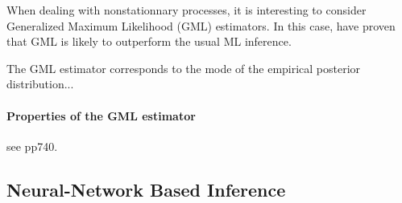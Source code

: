 \documentclass[11pt,a4paper,openany ]{book}
\begin{document}
When dealing with nonstationnary processes, it is interesting to consider Generalized Maximum Likelihood (GML) estimators. In this case, \cite{Adlouni_generalized_2007} have proven that GML is likely to outperform the usual ML inference.

The GML estimator corresponds to the mode of the empirical posterior distribution...

\paragraph{Properties of the GML estimator} see pp740. \citet{martin_generalized_2000}

\subsection{Neural-Network Based Inference}
\end{document}
